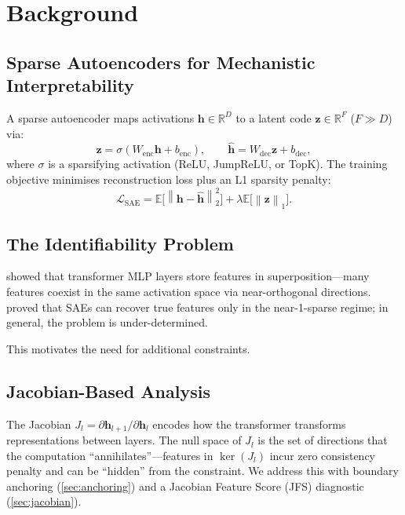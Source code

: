 \documentclass[12pt,a4paper]{article}
\newcommand{\RR}{\mathbb{R}}
\newcommand{\EE}{\mathbb{E}}
\newcommand{\norm}[1]{\left\|#1\right\|}
\newcommand{\calL}{\mathcal{L}}
\newcommand{\bz}{\mathbf{z}}
\newcommand{\bh}{\mathbf{h}}
\begin{document}
\section{Background}
\label{sec:background}

\subsection{Sparse Autoencoders for Mechanistic Interpretability}

A sparse autoencoder maps activations $\bh \in \RR^D$ to a latent code
$\bz \in \RR^F$ ($F \gg D$) via:
\[
  \bz = \sigma(W_{\mathrm{enc}} \bh + b_{\mathrm{enc}}), \qquad
  \hat{\bh} = W_{\mathrm{dec}} \bz + b_{\mathrm{dec}},
\]
where $\sigma$ is a sparsifying activation (ReLU, JumpReLU, or TopK).
The training objective minimises reconstruction loss plus an L1 sparsity penalty:
\[
  \calL_{\mathrm{SAE}} = \EE\bigl[\norm{\bh - \hat{\bh}}_2^2\bigr]
    + \lambda \EE\bigl[\norm{\bz}_1\bigr].
\]

\subsection{The Identifiability Problem}

\citet{elhage2022superposition} showed that transformer MLP layers store features
in superposition—many features coexist in the same activation space via
near-orthogonal directions.
\citet{cui2024identifiable} proved that SAEs can recover true features only in
the near-1-sparse regime; in general, the problem is under-determined.

This motivates the need for additional constraints.

\subsection{Jacobian-Based Analysis}

The Jacobian $J_l = \partial \bh_{l+1} / \partial \bh_l$ encodes how the
transformer transforms representations between layers.
The null space of $J_l$ is the set of directions that the computation
``annihilates''—features in $\ker(J_l)$ incur zero consistency penalty and can
be ``hidden'' from the constraint.
We address this with boundary anchoring (\cref{sec:anchoring}) and a Jacobian
Feature Score (JFS) diagnostic (\cref{sec:jacobian}).

\end{document}
